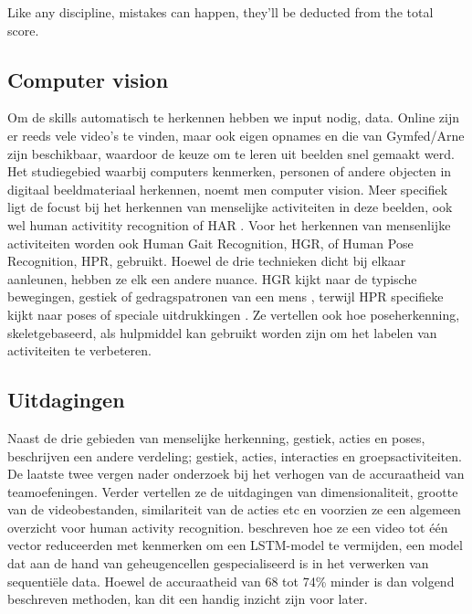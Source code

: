 Like any discipline, mistakes can happen, they'll be deducted from the total score.

\subsection{Computer vision}
\label{subsec:computer vision}

Om de skills automatisch te herkennen hebben we input nodig, data. Online zijn er reeds vele video's te vinden, maar ook eigen opnames en die van Gymfed/Arne zijn beschikbaar, waardoor de keuze om te leren uit beelden snel gemaakt werd. Het studiegebied waarbij computers kenmerken, personen of andere objecten in digitaal beeldmateriaal herkennen, noemt men computer vision. Meer specifiek ligt de focust bij het herkennen van menselijke activiteiten in deze beelden, ook wel human activitity recognition of HAR \autocite{Pareek_2020}.
Voor het herkennen van mensenlijke activiteiten worden ook Human Gait Recognition, HGR, of Human Pose Recognition, HPR, gebruikt. Hoewel de drie technieken dicht bij elkaar aanleunen, hebben ze elk een andere nuance. HGR kijkt naar de typische bewegingen, gestiek of gedragspatronen van een mens \autocite{Alharthi_2019}, terwijl HPR specifieke kijkt naar poses of speciale uitdrukkingen \autocite{Song_2021}. Ze vertellen ook hoe poseherkenning, skeletgebaseerd, als hulpmiddel kan gebruikt worden zijn om het labelen van activiteiten te verbeteren.


\subsection{Uitdagingen}
\label{subsec:uitdagingen}

Naast de drie gebieden van menselijke herkenning, gestiek, acties en poses, beschrijven \textcite{Pareek_2020} een andere verdeling; gestiek, acties, interacties en groepsactiviteiten. De laatste twee vergen nader onderzoek bij het verhogen van de accuraatheid van teamoefeningen. Verder vertellen ze de uitdagingen van dimensionaliteit, grootte van de videobestanden, similariteit van de acties etc en voorzien ze een algemeen overzicht voor human activity recognition. \textcite{Issa_2023} beschreven hoe ze een video tot één vector reduceerden met kenmerken om een LSTM-model te vermijden, een model dat aan de hand van geheugencellen gespecialiseerd is in het verwerken van sequentiële data. Hoewel de accuraatheid van 68 tot 74\% minder is dan volgend beschreven methoden, kan dit een handig inzicht zijn voor later.


